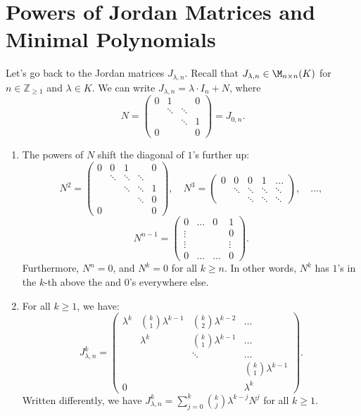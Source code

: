 \section{Powers of Jordan Matrices and Minimal Polynomials}

Let's go back to the Jordan matrices $J_{\lambda, n}$.
Recall that $J_{\lambda, n} \in \M_{n \times n}(K)$ for $n \in \mathbb{Z}_{\ge 1}$ and $\lambda \in K$.
We can write $J_{\lambda, n} = \lambda \cdot I_n + N$, where
\[
N = \begin{pmatrix} 0 & 1 & & 0 \\ & \ddots & \ddots & \\ & & \ddots & 1 \\ 0 & & & 0 \end{pmatrix} = J_{0, n}.
\]

\begin{lemma}
\label{lem:powers_jordan_blocks}
\leavevmode
\begin{enumerate}[label=\textbf{(\alph*)}]
    \item The powers of $N$ shift the diagonal of $1$'s further up:
    \[
    N^2 = \begin{pmatrix} 0 & 0 & 1 & & 0 \\ & \ddots & \ddots & \ddots & \\ & & \ddots & \ddots & 1 \\ & & & \ddots & 0 \\ 0 & & & & 0 \end{pmatrix}, \quad N^3 = \begin{pmatrix} 0 & 0 & 0 & 1 & \dots \\ & \ddots & \ddots & \ddots & \ddots \\ & & \ddots & \ddots & \ddots \end{pmatrix}, \quad \dots, 
    \]
    \[
    N^{n-1} = \begin{pmatrix} 0 & \dots & 0 & 1 \\ \vdots & & & 0 \\ \vdots & & & \vdots \\ 0 & \dots & \dots & 0 \end{pmatrix}.
    \]
    Furthermore, $N^n = 0$, and $N^k = 0$ for all $k \ge n$. In other words, $N^k$ has $1$'s in the $k$-th  above the  and $0$'s everywhere else.
    
    \item For all $k \ge 1$, we have:
    \[
    J_{\lambda, n}^k = \begin{pmatrix} \lambda^k & \binom{k}{1}\lambda^{k-1} & \binom{k}{2}\lambda^{k-2} & \dots \\ & \lambda^k & \binom{k}{1}\lambda^{k-1} & \dots \\ & & \ddots & \dots \\ & & & \binom{k}{1}\lambda^{k-1} \\ 0 & & & \lambda^k \end{pmatrix}.
    \]
    Written differently, we have $J_{\lambda, n}^k = \sum_{j=0}^k \binom{k}{j} \lambda^{k-j} N^j$ for all $k \ge 1$.
\end{enumerate}
\end{lemma}

